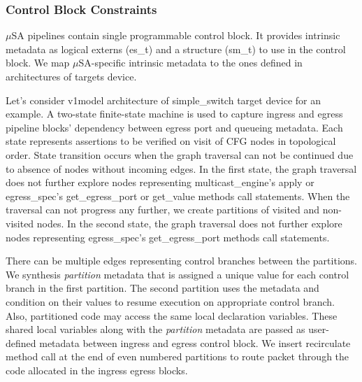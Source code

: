 \documentclass{hotnets19}
\begin{document}


\subsubsection{Control Block Constraints}
$\mu$SA pipelines contain single programmable control block. 
It provides intrinsic metadata as logical externs (es\_t) and a structure (sm\_t) to use in the control block.
We map $\mu$SA-specific intrinsic metadata to the ones defined in architectures of targets device.

Let's consider v1model architecture of simple\_switch target device for an example.
A two-state finite-state machine is used to capture ingress and egress pipeline blocks' dependency between egress port and queueing metadata.
Each state represents assertions to be verified on visit of CFG nodes in topological order.
State transition occurs when the graph traversal can not be continued due to absence of nodes without incoming edges.
In the first state, the graph traversal does not further explore nodes representing multicast\_engine's apply or egress\_spec's get\_egress\_port or get\_value methods call statements.
When the traversal can not progress any further, we create partitions of visited and non-visited nodes.
In the second state, the graph traversal does not further explore nodes representing egress\_spec's get\_egress\_port methods call statements.


There can be multiple edges representing control branches between the partitions.
We synthesis \emph{partition} metadata that is assigned a unique value for each control branch in the first partition.
The second partition uses the metadata and condition on their values to resume execution on appropriate control branch.
Also, partitioned code may access the same local declaration variables.
These shared local variables along with the \emph{partition} metadata are passed as user-defined metadata between ingress and egress control block.
We insert recirculate method call at the end of even numbered partitions to route packet through the code allocated in the ingress egress blocks.
\end{document}
